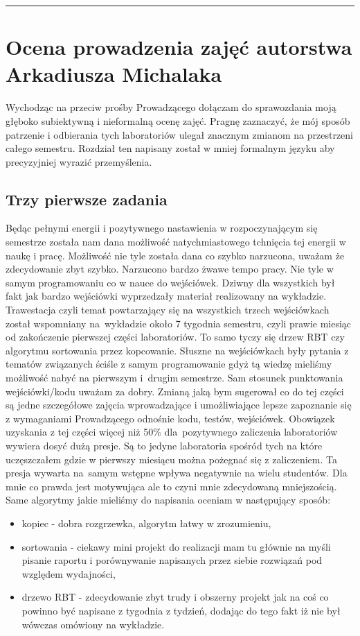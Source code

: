 \documentclass[a4paper,11pt]{article}
\newcommand{\linia}{\rule{\linewidth}{0.4mm}}
\begin{document}
\noindent\linia
\section{Ocena prowadzenia zajęć autorstwa Arkadiusza Michalaka}
Wychodząc na przeciw prośby Prowadzącego dołączam do sprawozdania moją głęboko subiektywną i nieformalną ocenę zajęć. Pragnę zaznaczyć, że mój sposób patrzenie i odbierania tych laboratoriów ulegał znacznym zmianom na przestrzeni całego semestru. Rozdział ten napisany został w mniej formalnym języku aby precyzyjniej wyrazić przemyślenia.
\subsection{Trzy pierwsze zadania}
Będąc pełnymi energii i pozytywnego nastawienia w rozpoczynającym się semestrze została nam dana możliwość natychmiastowego tchnięcia tej energii w naukę i pracę. Możliwość nie tyle została dana co szybko narzucona, uważam że zdecydowanie zbyt szybko. Narzucono bardzo żwawe tempo pracy. Nie tyle w samym programowaniu co w nauce do wejściówek. Dziwny dla wszystkich był fakt jak bardzo wejściówki wyprzedzały materiał realizowany na wykładzie. Trawestacja czyli temat powtarzający się na wszystkich trzech wejściówkach został wspomniany na~wykładzie około 7 tygodnia semestru, czyli prawie miesiąc od zakończenie pierwszej części laboratoriów. To samo tyczy się drzew RBT czy algorytmu sortowania przez kopcowanie. Słuszne na wejściówkach były pytania z tematów związanych ściśle z samym programowanie gdyż tą wiedzę mieliśmy możliwość nabyć na pierwszym i~drugim semestrze. Sam stosunek punktowania wejściówki/kodu uważam za dobry. Zmianą jaką bym sugerował co do tej części są jedne szczegółowe zajęcia wprowadzające i umożliwiające lepsze zapoznanie się z wymaganiami Prowadzącego odnośnie kodu, testów, wejściówek. Obowiązek uzyskania z tej części więcej niż 50\% dla~pozytywnego zaliczenia laboratoriów wywiera dosyć dużą presje. Są to jedyne laboratoria spośród tych na które uczęszczałem gdzie w pierwszy miesiącu można pożegnać się z zaliczeniem. Ta presja wywarta na~samym wstępne wpływa negatywnie na wielu studentów. Dla mnie co prawda jest motywująca ale to czyni mnie zdecydowaną mniejszością. Same algorytmy jakie mieliśmy do napisania oceniam w następujący sposób:
\begin{itemize}
\item kopiec - dobra rozgrzewka, algorytm łatwy w zrozumieniu,
\item sortowania - ciekawy mini projekt do realizacji mam tu głównie na myśli pisanie raportu i porównywanie napisanych przez siebie rozwiązań pod względem wydajności,
\item drzewo RBT - zdecydowanie zbyt trudy i obszerny projekt jak na coś co powinno być napisane z tygodnia z tydzień, dodając do tego fakt iż nie był wówczas omówiony na wykładzie.
\end{itemize}
\end{document}
